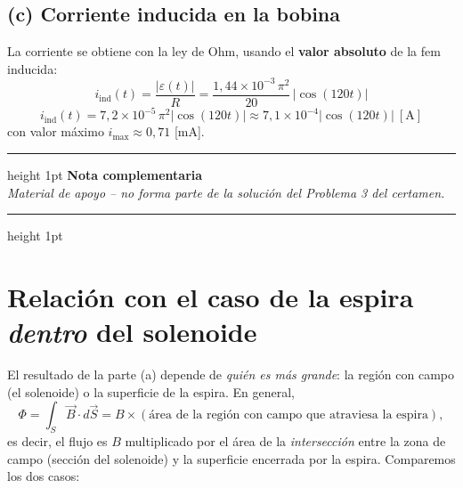 \documentclass[12pt,letterpaper]{article}
\begin{document}
\subsection*{(c) Corriente inducida en la bobina}

La corriente se obtiene con la ley de Ohm, usando el \textbf{valor absoluto} de la fem inducida:
\[
    i_{\text{ind}}(t)=\frac{|\varepsilon(t)|}{R}
    =\frac{1{,}44\times10^{-3}\,\pi^{2}}{20}\,\big|\cos(120t)\big|
\]
\[
    \boxed{i_{\text{ind}}(t)=7{,}2\times10^{-5}\,\pi^{2}\big|\cos(120t)\big|\approx7{,}1\times10^{-4}\big|\cos(120t)\big|\ [\text{A}]}
\]
con valor m\'aximo $i_{\max}\approx0{,}71$ [mA].

\newpage

\begin{center}
\vspace*{0.2cm}
\hrule height 1pt
\vspace{0.35cm}
{\large\textcolor{ubbblue}{\textbf{Nota complementaria}}}\\[0.15cm]
{\normalsize\textit{Material de apoyo -- no forma parte de la soluci\'on del Problema 3 del certamen.}}
\vspace{0.35cm}
\hrule height 1pt
\end{center}

\vspace{0.5cm}

\section*{Relaci\'on con el caso de la espira \emph{dentro} del solenoide}

El resultado de la parte (a) depende de \emph{qui\'en es m\'as grande}: la regi\'on con campo (el
solenoide) o la superficie de la espira. En general,
\[
    \Phi=\int_S\vec B\cdot d\vec S = B\times(\text{\'area de la regi\'on con campo que atraviesa la espira}),
\]
es decir, el flujo es $B$ multiplicado por el \'area de la \emph{intersecci\'on} entre la zona de
campo (secci\'on del solenoide) y la superficie encerrada por la espira. Comparemos los dos casos:
\end{document}
